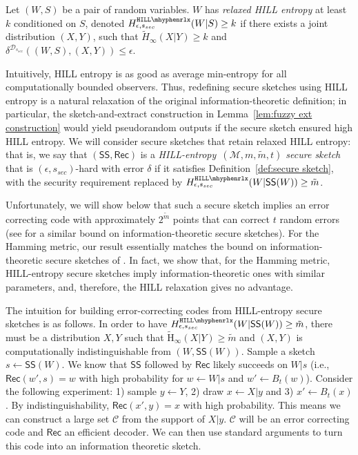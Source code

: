\documentclass{llncs}
\newcommand{\defref}[1]{\mbox{Definition~\ref{#1}}}
\newcommand{\lemref}[1]{\mbox{Lemma~\ref{#1}}}
\newcommand{\class}[1]{{\ensuremath{\mathsf{#1}}}}
\newcommand{\sketch}{\ensuremath{\class{SS}}\xspace}
\newcommand{\rec}{\ensuremath{\class{Rec}}\xspace}
\newcommand{\hillrlx}{\ensuremath{\mathtt{HILL\mhyphen rlx}}\xspace}
\newcommand{\Hav}{\tilde{\mathrm{H}}_\infty}
\begin{document}
\begin{definition}
\label{def:relaxed hill}
Let $(W, S)$ be a pair of random variables.  $W$ has 
\emph{relaxed HILL entropy} at least $k$ conditioned on $S$,
denoted $H^{\hillrlx}_{\epsilon, s_{sec}}(W|S)\geq k$ if there exists a joint distribution $(X, Y)$, such that $\tilde{H}_\infty(X|Y)\geq k$ and $\delta^{\mathcal{D}_{s_{sec}}} ((W, S),(X,Y))\leq \epsilon$.
\end{definition}

Intuitively, HILL entropy is as good as average min-entropy for all computationally bounded observers.  Thus, redefining secure sketches using HILL entropy is a  natural relaxation of the original information-theoretic definition; in particular, the sketch-and-extract construction in \lemref{lem:fuzzy ext construction} would yield pseudorandom outputs if the secure sketch ensured high HILL entropy.  
We will consider secure sketches that retain relaxed HILL entropy: that is, we say that $(\sketch, \rec)$ is a  \emph{HILL-entropy~$(\mathcal{M}, m, \tilde{m}, t)$ secure sketch} that is $(\epsilon,s_{sec})$-hard with error $\delta$ if it satisfies \defref{def:secure sketch}, with the security requirement replaced by $H^{\hillrlx}_{\epsilon, s_{sec}}(W|\sketch(W))\geq \tilde{m}$. 

Unfortunately, we will show below that such a secure sketch implies an error correcting code with approximately $2^{\tilde{m}}$ points that can correct $t$ random errors (see  \cite[Lemma C.1]{DBLP:journals/siamcomp/DodisORS08} for a similar bound on information-theoretic secure sketches). For the Hamming metric, our result essentially matches the bound on information-theoretic secure sketches of \cite[Proposition 8.2]{DBLP:journals/siamcomp/DodisORS08}.  In fact, we show that, for the Hamming metric, HILL-entropy secure sketches imply information-theoretic ones with similar parameters, and, therefore, the HILL relaxation gives no advantage. 

The intuition for building error-correcting codes from HILL-entropy secure sketches is as follows.  In order to have  $H^{\hillrlx}_{\epsilon, s_{sec}}(W|\sketch(W))\ge \tilde{m}$, there must be a distribution $X, Y$ such that $\Hav(X | Y)\geq \tilde{m}$ and $(X, Y)$ is computationally indistinguishable from $(W, \sketch(W))$.  Sample a sketch $s\leftarrow \sketch(W)$. We know that $\sketch$ followed by $\rec$ likely succeeds on $W|s$  (i.e., $\rec (w', s) = w$ with high probability for $w\leftarrow W|s$ and $w'\leftarrow B_t(w)$).  %
 Consider the following experiment: 1) sample $y\leftarrow Y$, 2) draw $x\leftarrow X|y$ and 3) $x'\leftarrow B_t(x)$. By indistinguishability, $\rec (x',y) = x$ with high probability.
 This means we can construct a large set $\mathcal{C}$ from the support of $X|y$.  $\mathcal{C}$ will be an error correcting code and $\rec$ an efficient decoder.  We can then use standard arguments to turn this code into an information theoretic sketch.  
\end{document}
